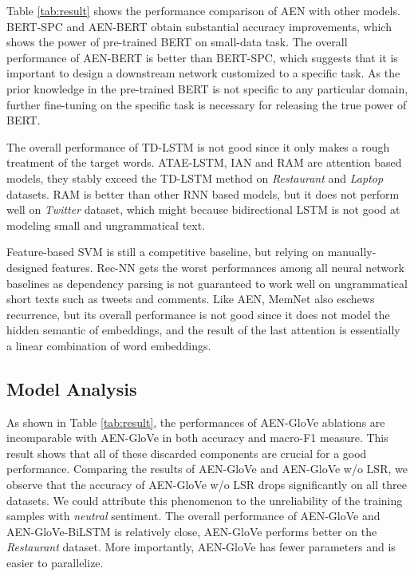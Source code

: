 \documentclass[11pt,a4paper]{article}
\begin{document}
Table \ref{tab:result} shows the performance comparison of AEN with other models.
BERT-SPC and AEN-BERT obtain substantial accuracy improvements,
which shows the power of pre-trained BERT on small-data task.
The overall performance of AEN-BERT is better than BERT-SPC,
which suggests that it is important to design a downstream network customized to a specific task.
As the prior knowledge in the pre-trained BERT is not specific to any particular domain,
further fine-tuning on the specific task is necessary for releasing the true power of BERT.


The overall performance of TD-LSTM is not good since it only makes a rough treatment of the target words.
ATAE-LSTM, IAN and RAM are attention based models, they stably exceed the TD-LSTM method on \emph{Restaurant} and \emph{Laptop} datasets.
RAM is better than other RNN based models, but it does not perform well on \emph{Twitter} dataset,
which might because bidirectional LSTM is not good at modeling small and ungrammatical text.

Feature-based SVM
is still a competitive baseline,
but relying on manually-designed features.
Rec-NN gets the worst performances among all neural network baselines
as dependency parsing is not guaranteed to work well on ungrammatical short texts such as tweets and comments.
Like AEN, MemNet also eschews recurrence, but its overall performance is not good
since it does not model the hidden semantic of embeddings, and the result of the last attention is essentially a linear combination of word embeddings.



\subsection{Model Analysis}

As shown in Table \ref{tab:result}, the performances of AEN-GloVe ablations are incomparable
with AEN-GloVe in both accuracy and macro-F1 measure.
This result shows that all of these discarded components are crucial for a good performance.
Comparing the results of AEN-GloVe and AEN-GloVe w/o LSR, we observe that the accuracy of AEN-GloVe w/o LSR drops significantly on all three datasets.
We could attribute this phenomenon to the unreliability of the training samples with \textit{neutral} sentiment.
The overall performance of AEN-GloVe and AEN-GloVe-BiLSTM is relatively close,
AEN-GloVe performs better on the \emph{Restaurant} dataset.
More importantly, AEN-GloVe has fewer parameters and is easier to parallelize.
\end{document}
